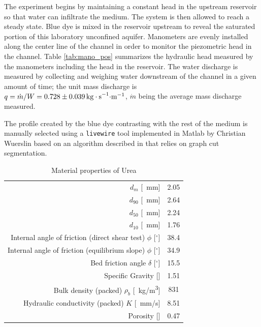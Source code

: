 \documentclass[
10pt, %
letterpaper, %
twoside, %
headinclude,footinclude, %
]{scrartcl}
\begin{document}
The experiment begins by maintaining a constant head in the upstream reservoir so that water can infiltrate the medium. The system is then allowed to reach a steady state. Blue dye is mixed in the reservoir upstream to reveal the saturated portion of this laboratory unconfined aquifer. Manometers are evenly installed along the center line of the channel in order to monitor the piezometric head in the channel. Table \ref{tab:mano_pos} summarizes the hydraulic head measured by the manometers including the head in the reservoir. The water discharge is measured by collecting and weighing water downstream of the channel in a given amount of time; the unit mass discharge is $q = \dot{m} /W = \SI{0.728 \pm 0.039}{kg \cdot s^{-1} \cdot m^{-1}}$, $\dot{m}$ being the average mass discharge measured.

The profile created by the blue dye contrasting with the rest of the medium is manually selected using a \verb|livewire| tool implemented in Matlab by Christian Wuerslin based on an algorithm described in \cite{mortensen1995intelligent} that relies on graph cut segmentation.

\begin{table}[h]
	\caption{Material properties of Urea}
	\label{tab:gran_mat}
	\centering
	\begin{tabular}{rc}
		\toprule
		$d_m$ [\SI{}{mm}]                                 & 2.05 \\
		$d_{90}$ [\SI{}{mm}]                              & 2.64 \\
		$d_{50}$ [\SI{}{mm}]                              & 2.24 \\
		$d_{10}$ [\SI{}{mm}]                              & 1.76 \\
		Internal angle of friction (direct shear test) $\phi$ [$^\circ$] & 38.4 \\
		Internal angle of friction (equilibrium slope) $\phi$ [$^\circ$] & 34.9 \\
		Bed friction angle $\delta$ [$^\circ$]            & 15.5 \\
		Specific Gravity [\textendash]                    & 1.51 \\
		Bulk density (packed) $\rho_b$ [\SI{}{kg/m^3}]    & 831  \\
		Hydraulic conductivity (packed) $K$ [\SI{}{mm/s}] & 8.51 \\
		Porosity  [\textendash]                           & 0.47 \\ \bottomrule
	\end{tabular}%
\end{table}
\end{document}
